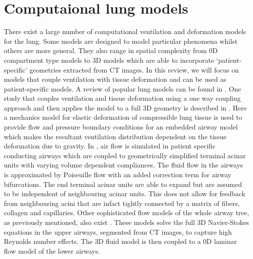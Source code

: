 \section{Computaional lung models}
\label{section:review_models}
%
There exist a large number of computational ventilation and deformation models for the lung. Some models are designed to model particular phenomena whilst others are more general. They also range in spatial complexity from 0D compartment type models to 3D models which are able to incorporate `patient-specific' geometries extracted from CT images. In this review, we will focus on models that couple ventilation with tissue deformation and can be used as patient-specific models. A review of popular lung models can be found in \cite{bates2009lung}. 
%
One study that couples ventilation and tissue deformation using a one way coupling approach and then applies the model to a full 3D geometry is described in \cite{tawhai2010image}. Here a mechanics model for elastic deformation of compressible lung tissue is used to provide flow and pressure boundary conditions for an embedded airway model which makes the resultant ventilation distribution dependent on the tissue deformation due to gravity. In \cite{Swan2012}, air flow is simulated in patient specific conducting airways which are coupled to geometrically simplified terminal acinar units with varying volume dependent compliances. The fluid flow in the airways is approximated by Poiseuille flow with an added correction term for airway bifurcations. The end terminal acinar units are able to expand but are assumed to be independent of neighbouring acinar units. This does not allow for feedback from neighbouring acini that are infact tightly connected by a matrix of fibers, collagen and capillaries. 
Other sophisticated flow models of the whole airway tree, as previously mentioned, also exist \citep{yin2013multiscale,ismail2013coupled}. These models solve the full 3D Navier-Stokes equations in the upper airways, segmented from CT images, to capture high Reynolds number effects. The 3D fluid model is then coupled to a 0D laminar flow model of the lower airways. %


